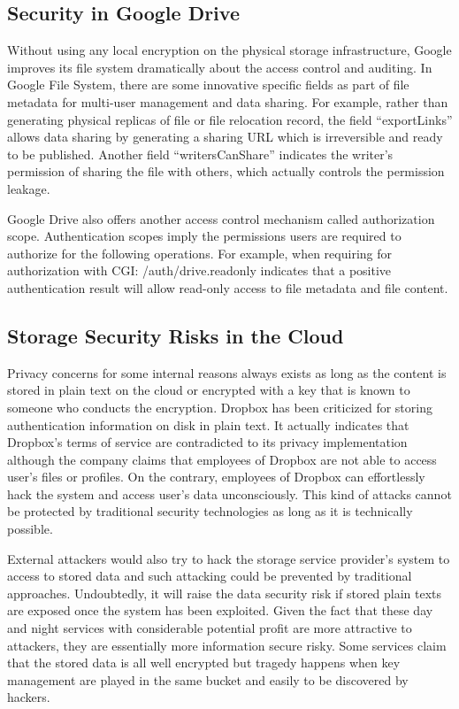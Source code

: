 \subsection{Security in Google Drive}

Without using any local encryption on the physical storage infrastructure, Google improves its file system dramatically about the access control and auditing. In Google File System, there are some innovative specific fields as part of file metadata for multi-user management and data sharing. For example, rather than generating physical replicas of file or file relocation record, the field ``exportLinks'' allows data sharing by generating a sharing URL which is irreversible and ready to be published. Another field ``writersCanShare'' indicates the writer’s permission of sharing the file with others, which actually controls the permission leakage.

Google Drive also offers another access control mechanism called authorization scope. Authentication scopes imply the permissions users are required to authorize for the following operations. For example, when requiring for authorization with CGI: /auth/drive.readonly indicates that a positive authentication result will allow read-only access to file metadata and file content.

\subsection{Storage Security Risks in the Cloud}

Privacy concerns for some internal reasons always exists as long as the content is stored in plain text on the cloud or encrypted with a key that is known to someone who conducts the encryption. Dropbox has been criticized for storing authentication information on disk in plain text. It actually indicates that Dropbox's terms of service are contradicted to its privacy implementation although the company claims that employees of Dropbox are not able to access user’s files or profiles\cite{Icaza2011}. On the contrary, employees of Dropbox can effortlessly hack the system and access user’s data unconsciously\cite{Dhillon2001}. This kind of attacks cannot be protected by traditional security technologies as long as it is technically possible\cite{Yao2010}.

External attackers would also try to hack the storage service provider’s system to access to stored data and such attacking could be prevented by traditional approaches\cite{Uppalli2003}. Undoubtedly, it will raise the data security risk if stored plain texts are exposed once the system has been exploited. Given the fact that these day and night services with considerable potential profit are more attractive to attackers, they are essentially more information secure risky. Some services claim that the stored data is all well encrypted but tragedy happens when key management are played in the same bucket and easily to be discovered by hackers.

